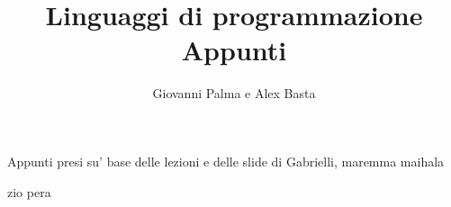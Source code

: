\documentclass{report}
\title{\Huge{Linguaggi di programmazione}\\Appunti}
\author{\huge{Giovanni Palma e Alex Basta}}
\date{}
\begin{document}
\maketitle
\newpage%

\tableofcontents

\pagebreak

Appunti presi su' base delle lezioni e delle slide di Gabrielli, maremma maihala 







zio pera
\end{document}
